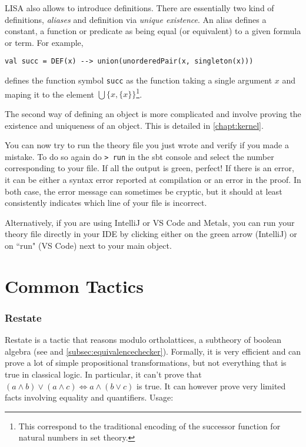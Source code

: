 LISA also allows to introduce definitions. There are essentially two kind of definitions, \emph{aliases} and definition via \emph{unique existence}.
An alias defines a constant, a function or predicate as being equal (or equivalent) to a given formula or term. For example,

\noindent\begin{minipage}{\linewidth}\vspace{1em}
  \begin{lstlisting}[language=lisa, frame=single]
  val succ = DEF(x) --> union(unorderedPair(x, singleton(x)))
  \end{lstlisting}
\end{minipage}
defines the function symbol \lstinline|succ| as the function taking a single argument $x$ and maping it to the element $\bigcup \lbrace x, \lbrace x \rbrace \rbrace$\footnote{This correspond to the traditional encoding of the successor function for natural numbers in set theory.}.

The second way of defining an object is more complicated and involve proving the existence and uniqueness of an object. This is detailed in \autoref{chapt:kernel}.

You can now try to run the theory file you just wrote and verify if you made a mistake. To do so again do \lstinline|> run| in the sbt console and select the number corresponding to your file. 
If all the output is green, perfect! If there is an error, it can be either a syntax error reported at compilation or an error in the proof. In both case, the error message can sometimes be cryptic, but it should at least consistently indicates which line of your file is incorrect.

Alternatively, if you are using IntelliJ or VS Code and Metals, you can run your theory file directly in your IDE by clicking either on the green arrow (IntelliJ) or on ``run" (VS Code) next to your main object.


\section{Common Tactics}
\subsubsection*{Restate}
Restate is a tactic that reasons modulo ortholattices, a subtheory of boolean algebra (see \cite{guilloudFormulaNormalizationsVerification2023} and \autoref{subsec:equivalencechecker}). Formally, it is very efficient and can prove a lot of simple propositional transformations, but not everything that is true in classical logic. In particular, it can't prove that $(a\land b) \lor (a \land c) \iff a \land (b \lor c)$ is true. It can however prove very limited facts involving equality and quantifiers. Usage:

